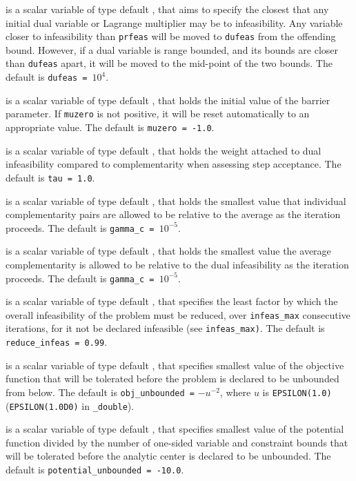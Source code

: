 \begin{description}
 is a scalar variable of type default \realdp, that aims to specify
the closest that any initial dual variable or Lagrange multiplier may be to
infeasibility. Any variable closer to infeasibility than {\tt prfeas} will be
moved to {\tt dufeas} from the offending bound. However, if a dual variable
is range bounded, and its bounds are closer than {\tt dufeas} apart, it will
be moved to the mid-point of the two bounds.
The default is {\tt dufeas = $10^4$}.

  is a scalar variable of type default \realdp, that holds the
initial value of the barrier parameter. If {\tt muzero} is
not positive, it will be reset automatically to an appropriate value.
The default is {\tt muzero = -1.0}.

  is a scalar variable of type default \realdp, that holds the
weight attached to dual infeasibility compared to complementarity
when assessing step acceptance.
The default is {\tt tau = 1.0}.

  is a scalar variable of type default \realdp, that holds the
smallest value that individual complementarity pairs are allowed
to be relative to the average as the iteration proceeds.
The default is {\tt gamma\_c = $10^{-5}$}.

  is a scalar variable of type default \realdp, that holds the
smallest value the average complementarity is allowed
to be relative to the dual infeasibility as the iteration proceeds.
The default is {\tt gamma\_c = $10^{-5}$}.

  is a scalar variable of type default
\realdp, that specifies the
least factor by which the overall infeasibility of the problem must be reduced,
over {\tt infeas\_max} consecutive iterations,
for it not be declared infeasible (see {\tt infeas\_max)}.
The default is {\tt reduce\_infeas = 0.99}.

  is a scalar variable of type default
\realdp, that specifies smallest
value of the objective function that will be tolerated before the problem
is declared to be unbounded from below.
The default is {\tt obj\_u\-nbounded =} $-u^{-2}$,
where $u$ is {\tt EPSILON(1.0)} ({\tt EPSILON(1.0D0)} in
{\tt \fullpackagename\_double}).

  is a scalar variable of type default
\realdp, that specifies smallest
value of the potential function divided by the number of one-sided variable and
constraint bounds that will be tolerated before the analytic center is
declared to be unbounded.
The default is {\tt potential\_u\-nbounded = -10.0}.


\end{description}

